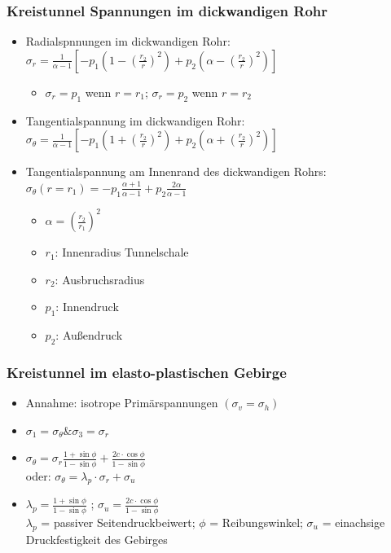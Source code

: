 \documentclass[fleqn,twoside]{article}
\begin{document}
\subsubsection{Kreistunnel Spannungen im dickwandigen Rohr}
\begin{itemize}
    \item Radialspnnungen im dickwandigen Rohr: $\sigma_r=\frac{1}{\alpha-1}\left[-p_1\left(1-\left(\frac{r_2}{r}\right)^2\right)+p_2\left(\alpha-\left(\frac{r_2}{r}\right)^2\right)\right]$
    \begin{itemize}
        \item $\sigma_r=p_1$ wenn $r=r_1$; $\sigma_r=p_2$ wenn $r=r_2$
    \end{itemize}
    \item Tangentialspannung im dickwandigen Rohr: $\sigma_{\theta}=\frac{1}{\alpha-1}\left[-p_1\left(1+\left(\frac{r_2}{r}\right)^2\right)+p_2\left(\alpha+\left(\frac{r_2}{r}\right)^2\right)\right]$
    \item Tangentialspannung am Innenrand des dickwandigen Rohrs: $\sigma_{\theta}(r=r_1)=-p_1\frac{\alpha+1}{\alpha-1}+p_2\frac{2\alpha}{\alpha-1}$
    \begin{itemize}
        \item $\alpha=\left(\frac{r_2}{r_1}\right)^2$
        \item $r_1$: Innenradius Tunnelschale
        \item $r_2$: Ausbruchsradius
        \item $p_1$: Innendruck
        \item $p_2$: Außendruck
    \end{itemize}
\end{itemize}

\subsubsection{Kreistunnel im elasto-plastischen Gebirge}
\begin{itemize}
	\item Annahme: isotrope Primärspannungen $(\sigma_v = \sigma_h)$
	\item $\sigma_1 = \sigma_\theta \& \sigma_3 = \sigma_r$
	\item $\sigma_\theta = \sigma_r \frac{1+\sin\phi}{1-\sin\phi} + \frac{2c \cdot \cos\phi}{1-\sin\phi}$\\
	oder: $\sigma_\theta = \lambda_p \cdot \sigma_r + \sigma_u$
	\item $\lambda_p = \frac{1+\sin\phi}{1-\sin\phi}$ ; $\sigma_u = \frac{2c \cdot \cos\phi}{1-\sin\phi}$\\
	$\lambda_p$ = passiver Seitendruckbeiwert; $\phi$ = Reibungswinkel; $\sigma_u$ = einachsige Druckfestigkeit des Gebirges
\end{itemize}
\end{document}
